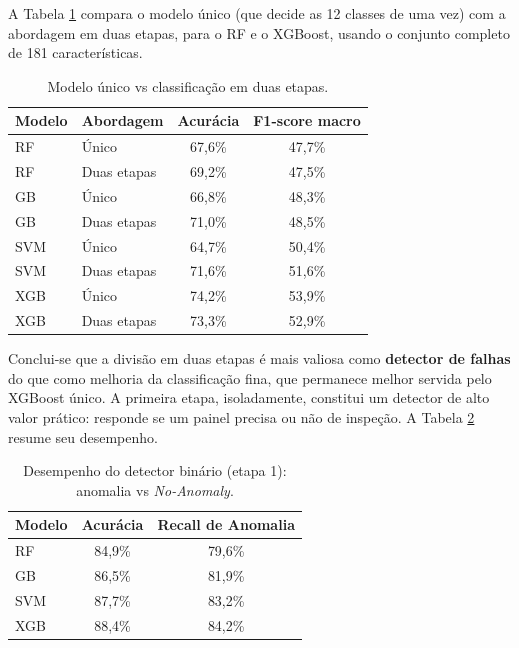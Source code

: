 \documentclass[a4paper,11pt]{article}
\begin{document}
A Tabela \ref{tab:duas_etapas} compara o modelo único (que decide as 12 classes de uma vez) com a abordagem em duas etapas, para o RF e o XGBoost, usando o conjunto completo de 181 características.

\begin{table}[H]
	\centering
	\caption{Modelo único vs classificação em duas etapas.}
	\label{tab:duas_etapas}
	\vspace{0.2cm}
	\renewcommand{\arraystretch}{1.2}
	\begin{tabular}{l l c c}
		\hline
		\textbf{Modelo} & \textbf{Abordagem} & \textbf{Acurácia} & \textbf{F1-score macro} \\
		\hline
		RF  & Único       & 67,6\% & 47,7\% \\ \hline
		RF  & Duas etapas & 69,2\% & 47,5\% \\ \hline
		GB  & Único       & 66,8\% & 48,3\% \\ \hline
		GB  & Duas etapas & 71,0\% & 48,5\% \\ \hline
		SVM & Único       & 64,7\% & 50,4\% \\ \hline
		SVM & Duas etapas & 71,6\% & 51,6\% \\ \hline
		XGB & Único       & 74,2\% & 53,9\% \\ \hline
		XGB & Duas etapas & 73,3\% & 52,9\% \\
		\hline
	\end{tabular}
\end{table}

Conclui-se que a divisão em duas etapas é mais valiosa como \textbf{detector de falhas} do que como melhoria da classificação fina, que permanece melhor servida pelo XGBoost único. A primeira etapa, isoladamente, constitui um detector de alto valor prático: responde se um painel precisa ou não de inspeção. A Tabela \ref{tab:detector} resume seu desempenho.

\begin{table}[H]
	\centering
	\caption{Desempenho do detector binário (etapa 1): anomalia vs \textit{No-Anomaly}.}
	\label{tab:detector}
	\vspace{0.2cm}
	\renewcommand{\arraystretch}{1.2}
	\begin{tabular}{l c c}
		\hline
		\textbf{Modelo} & \textbf{Acurácia} & \textbf{Recall de Anomalia} \\
		\hline
		RF  & 84,9\% & 79,6\% \\ \hline
		GB  & 86,5\% & 81,9\% \\ \hline
		SVM & 87,7\% & 83,2\% \\ \hline
		XGB & 88,4\% & 84,2\% \\
		\hline
	\end{tabular}
\end{table}
\end{document}
